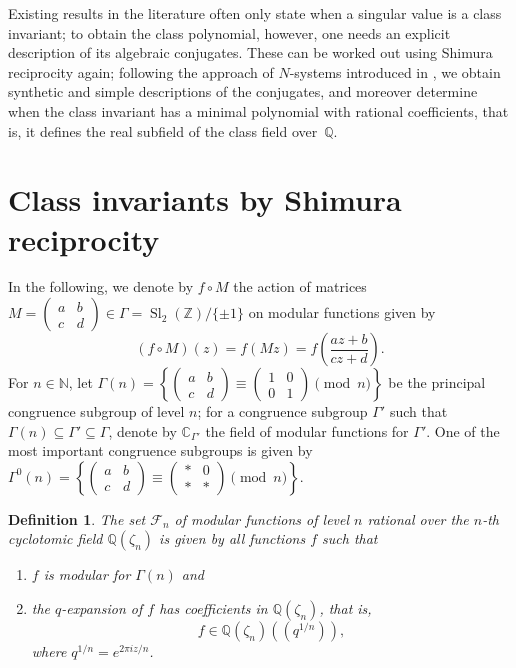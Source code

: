 \documentclass[12pt,twoside,leqno]{article}
\newtheorem{definition}[theorem]{Definition}
\numberwithin{equation}{section}
\newcommand{\F}{\mathcal F}
\newcommand{\N}{\mathbb N}
\newcommand{\Z}{\mathbb Z}
\newcommand{\Q}{\mathbb Q}
\newcommand{\C}{\mathbb C}
\newcommand{\Sl}{\operatorname {Sl}}
\begin{document}
Existing results in the literature often only state when
a singular value is a class invariant; to obtain the class polynomial,
however, one needs an explicit description of its algebraic conjugates.
These can be worked out using Shimura reciprocity again;
following the approach of $N$-systems introduced in \cite{Schertz02},
we obtain synthetic and simple descriptions of the conjugates, and moreover
determine when the class invariant has a minimal polynomial with rational
coefficients, that is, it defines the real subfield of the class field
over~$\Q$.



\section{Class invariants by Shimura reciprocity}
\label{sct:Shimura}

In the following, we denote by $f \circ M$ the action of matrices
$M = \begin {pmatrix} a & b \\ c & d \end {pmatrix}
\in \Gamma = \Sl_2 (\Z) / \{ \pm 1 \}$
on modular functions given by
\[
(f \circ M) (z) = f (M z) = f \left( \frac {a z + b}{c z + d} \right).
\]
For $n \in \N$, let
$\Gamma (n) = \left\{ \begin {pmatrix} a & b \\ c & d \end {pmatrix}
\equiv \begin {pmatrix} 1 & 0 \\ 0 & 1 \end {pmatrix}
\pmod n \right\}$
be the principal congruence subgroup of level $n$; for a
congruence subgroup $\Gamma'$ such that
$\Gamma (n) \subseteq \Gamma' \subseteq \Gamma$, denote by
$\C_{\Gamma'}$ the field of modular functions for $\Gamma'$.
One of the most important congruence subgroups is given by
$\Gamma^0 (n) = \left\{ \begin {pmatrix} a & b \\ c & d \end {pmatrix}
\equiv \begin {pmatrix} \ast & 0 \\ \ast & \ast \end {pmatrix}
\pmod n \right\}$.

\begin {definition}
\label {def:FN}
The set $\F_n$ of modular functions of level $n$ rational over the
$n$-th cyclotomic field $\Q (\zeta_n)$ is given by all functions
$f$ such that
\begin {enumerate}
\item
$f$ is modular for $\Gamma (n)$ and
\item
the $q$-expansion of $f$ has coefficients in $\Q (\zeta_n)$, that is,
\[
f \in \Q (\zeta_n) \left( \left( q^{1/n} \right) \right),
\]
where $q^{1/n} = e^{2 \pi i z / n}$.
\end {enumerate}
\end {definition}
\end{document}
